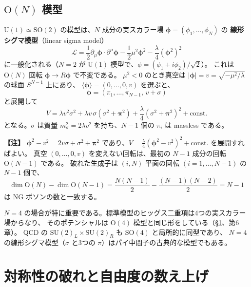 \documentclass[uplatex,dvipdfmx,a4paper,11pt,openany]{jsbook}
\newcommand{\term}[2]{\textbf{#1}（#2）}
\newenvironment{note}{\vspace{1ex}\par\footnotesize\noindent\textbf{【注】}}{\par\vspace{1ex}}
\numberwithin{equation}{chapter}
\theoremstyle{definition}
\theoremstyle{plain}
\theoremstyle{remark}
\newcommand{\Lag}{\mathcal{L}}
\newcommand{\SU}{\mathrm{SU}}
\newcommand{\U}{\mathrm{U}}
\newcommand{\SO}{\mathrm{SO}}
\begin{document}
\subsection{$\mathrm O(N)$ 模型}
$\U(1)\simeq\SO(2)$ の模型は、$N$ 成分の実スカラー場 $\bm\phi=(\phi_1,\dots,\phi_N)$ の
\term{線形シグマ模型}{linear sigma model}
\begin{equation}
\Lag=\frac12\partial_\mu\bm\phi\cdot\partial^\mu\bm\phi-\frac12\mu^2\bm\phi^2-\frac\lambda4(\bm\phi^2)^2
\label{eq:ON-model}
\end{equation}
に一般化される（$N=2$ が $\U(1)$ 模型で、$\phi=(\phi_1+i\phi_2)/\sqrt2$）。
これは $\mathrm O(N)$ 回転 $\bm\phi\to R\bm\phi$ で不変である。
$\mu^2<0$ のとき真空は $|\bm\phi|=v=\sqrt{-\mu^2/\lambda}$ の球面 $S^{N-1}$ 上にあり、
$\langle\bm\phi\rangle=(0,\dots,0,v)$ を選ぶと、
\begin{equation}
\bm\phi=(\pi_1,\dots,\pi_{N-1},\,v+\sigma)
\end{equation}
と展開して
\begin{equation}
V=\lambda v^2\sigma^2+\lambda v\,\sigma(\sigma^2+\bm\pi^2)+\frac\lambda4(\sigma^2+\bm\pi^2)^2+\text{const.}
\end{equation}
となる。$\sigma$ は質量 $m_\sigma^2=2\lambda v^2$ を持ち、$N-1$ 個の $\pi_i$ は massless である。
\begin{note}
$\bm\phi^2-v^2=2v\sigma+\sigma^2+\bm\pi^2$ であり、$V=\frac\lambda4(\bm\phi^2-v^2)^2+\text{const.}$ を展開すればよい。
真空 $(0,\dots,0,v)$ を変えない回転は、最初の $N-1$ 成分の回転 $\mathrm O(N-1)$ である。
破れた生成子は $(i,N)$ 平面の回転 $(i=1,\dots,N-1)$ の $N-1$ 個で、
\[
\dim\mathrm O(N)-\dim\mathrm O(N-1)=\frac{N(N-1)}{2}-\frac{(N-1)(N-2)}{2}=N-1
\]
は NG ボソンの数と一致する。
\end{note}
$N=4$ の場合が特に重要である。標準模型のヒッグス二重項は4つの実スカラー場からなり、
そのポテンシャルは $\mathrm O(4)$ 模型と同じ形をしている（\S\ref{sec:SSB-counting}、第6章）。
QCD の $\SU(2)_L\times\SU(2)_R$ も $\SO(4)$ と局所的に同型であり、
$N=4$ の線形シグマ模型（$\sigma$ と3つの $\pi$）はパイ中間子の古典的な模型でもある。
\section{対称性の破れと自由度の数え上げ}
\label{sec:SSB-counting}
\end{document}
